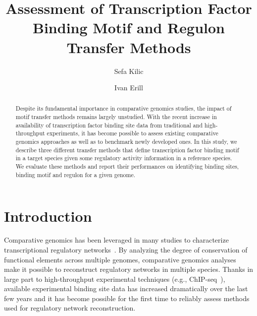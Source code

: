 \documentclass[]{llncs}
\begin{document}
\title{Assessment of Transcription Factor Binding Motif and Regulon Transfer
  Methods}
\author{Sefa Kilic \and Ivan Erill}

\maketitle

\begin{abstract}
  Despite its fundamental importance in comparative genomics studies, the impact
  of motif transfer methods remains largely unstudied. With the recent increase
  in availability of transcription factor binding site data from traditional and
  high-throughput experiments, it has become possible to assess existing
  comparative genomics approaches as well as to benchmark newly developed
  ones. In this study, we describe three different transfer methods that define
  transcription factor binding motif in a target species given some regulatory
  activity information in a reference species. We evaluate these methods and
  report their performances on identifying binding sites, binding motif and
  regulon for a given genome.
\end{abstract}

\section{Introduction}
Comparative genomics has been leveraged in many studies to characterize
transcriptional regulatory networks~\cite{gelfand2000prediction,
  ravcheev2013genomic, meireles2009comparative,kellis2004methods}. By analyzing
the degree of conservation of functional elements across multiple genomes,
comparative genomics analyses make it possible to reconstruct regulatory
networks in multiple species. Thanks in large part to high-throughput
experimental techniques (e.g., ChIP-seq~\cite{bailey2013practical}), available
experimental binding site data has increased dramatically over the last few
years and it has become possible for the first time to reliably assess methods
used for regulatory network reconstruction.
\end{document}
